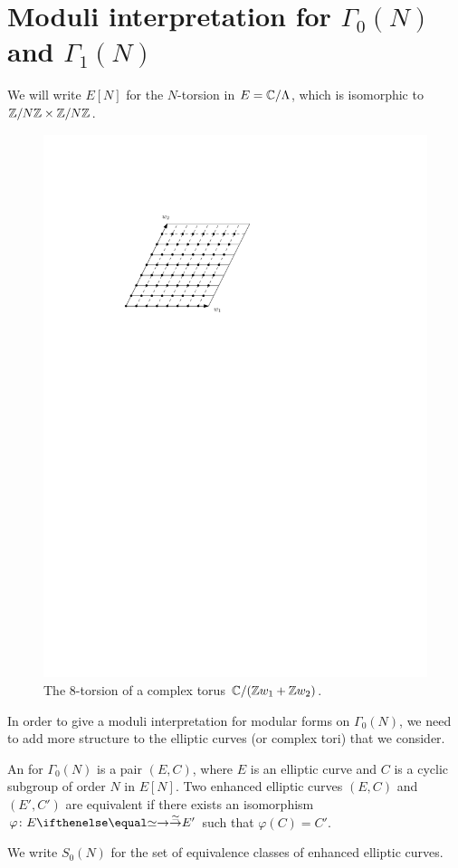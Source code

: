 \section{Moduli interpretation for \texorpdfstring{$\Gamma_0(N)$}{Gamma0(N)} and \texorpdfstring{$\Gamma_1(N)$}{Gamma1(N)}}
We will write $E[N]$ for the $N$-torsion in $E=\mathbb{C}/\Lambda$, which is isomorphic to  $\mathbb{Z}/N\mathbb{Z}\times \mathbb{Z}/N\mathbb{Z}$.
\begin{figure}[h]
  \centering
  \includegraphics{ntorsion.pdf}
  \caption{The $8$-torsion of a complex torus $\mathbb{C}/(\mathbb{Z} w_1 + \mathbb{Z} w_2)$.}
  \label{fig:n-torsion}
\end{figure}
In order to give a moduli interpretation for modular forms on $\Gamma_0(N)$, we need to add more structure
to the elliptic curves (or complex tori) that we consider.
\begin{definition}
  An  for $\Gamma_0(N)$ is a pair $(E,C)$, where $E$ is an elliptic curve
and $C$ is a cyclic subgroup of order $N$ in $E[N]$. Two enhanced elliptic curves $(E,C)$ and $(E',C')$ are
equivalent if there exists an isomorphism $\varphi\colon E\tto{\simeq} E'$ such that $\varphi(C)=C'$.
\end{definition}
We write $S_0(N)$ for the set of equivalence classes of enhanced elliptic curves.

